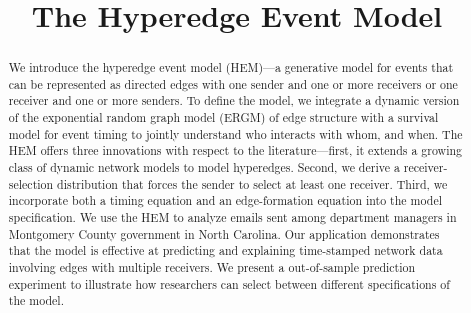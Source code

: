 \documentclass[ba]{imsart}
\numberwithin{equation}{section}
\theoremstyle{plain}
\begin{document}
\begin{frontmatter}
\title{The Hyperedge Event Model}


\begin{abstract}
We introduce the hyperedge event model (HEM)---a generative model for events that can be represented as directed edges with one sender and one or more receivers or one receiver and one or more senders. To define the model, we
integrate a dynamic version of the exponential random graph model (ERGM) of edge structure with a survival model for event timing to jointly understand who interacts with whom, and when. The HEM offers three innovations with respect to the literature---first, it extends a growing class of dynamic network models to model hyperedges. Second, we derive a receiver-selection distribution that forces the sender to select at least one receiver. Third, we incorporate both a timing equation and an edge-formation equation into the model specification. We use the HEM to analyze emails sent among department managers in Montgomery County government in North Carolina. Our application demonstrates that the model is effective at predicting and explaining time-stamped network data involving edges with multiple receivers. We present a out-of-sample prediction experiment to illustrate how researchers can select between different specifications of the model. 
\end{abstract}

\begin{keyword}[class=MSC]
\end{keyword}

\begin{keyword}
\kwd{\LaTeXe}
\end{keyword}

\end{frontmatter}
\end{document}
